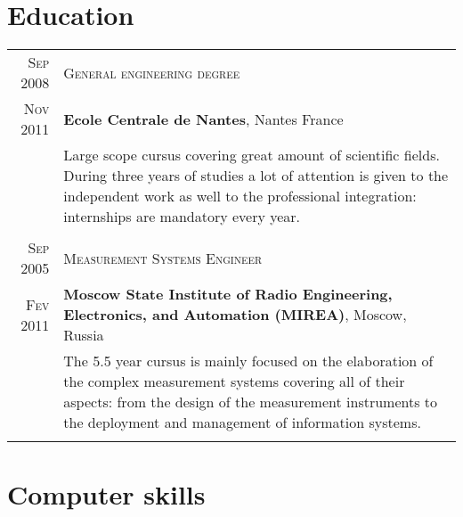 \documentclass[letter,10pt]{article} %
\begin{document}
\newpage

\section{Education}

\begin{tabular}{r|p{15.5cm}}


\textsc{Sep 2008} & \textsc{General engineering degree} \\
\textsc{Nov 2011} & \normalsize\textbf{Ecole Centrale de Nantes}, Nantes
France \\
& Large scope cursus covering great amount of scientific fields. During three
years of studies a lot of attention is given to the independent work as well to the professional integration: internships are mandatory every year. \\
&\\



\textsc{Sep 2005} & \textsc{Measurement Systems Engineer} \\
\textsc{Fev 2011} & \normalsize\textbf{Moscow State Institute of Radio
Engineering, Electronics, and Automation (MIREA)}, Moscow, Russia  \\
& The 5.5 year cursus is mainly focused on the
elaboration of the complex measurement systems covering all of their aspects:
from the design of the measurement instruments to the deployment and
management of information systems.
\\
&\\
\end{tabular}



\section{Computer skills}
\end{document}
